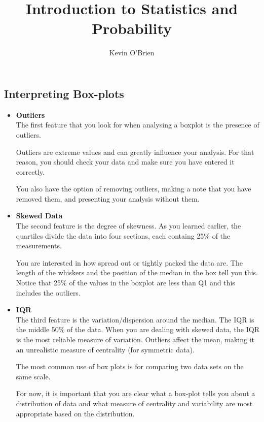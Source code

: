\documentclass[12pt]{article}
\title{Introduction to Statistics and Probability}
\author{Kevin O'Brien}
\begin{document}
\maketitle
\newpage
\tableofcontents


\newpage
\subsection{Interpreting Box-plots}

\begin{itemize} 
\item \textbf{Outliers}\\
The first feature that you look for when analysing a boxplot is the presence of outliers.
 
Outliers are extreme values and can greatly influence your analysis. For that reason, you should check your data and make sure you have entered it correctly.
 
You also have the option of removing outliers, making a note that you have removed them, and presenting your analysis without them.
 
\item \textbf{Skewed Data} \\
The second feature is the degree of skewness. As you learned earlier, the quartiles divide the data into four sections, each containg 25\% of the measurements. 

You are interested in how spread out or tightly packed the data are. The length of the whiskers and the position of the median in the box tell you this. Notice that 25\% of the values in the boxplot are less than Q1 and this includes the outliers.


\item \textbf{IQR} \\
The third feature is the variation/dispersion around the median. The IQR is the middle 50\% of the data. When you are dealing with skewed data, the IQR is the most reliable measure of variation. Outliers affect the mean, making it an unrealistic measure of centrality (for symmetric data).

The most common use of box plots is for comparing two data sets on the same scale. 

For now, it is important that you are clear what a box-plot tells you about a distribution of data and what measure of centrality and variability are most appropriate based on the distribution.

\end{itemize} 
\end{document}
